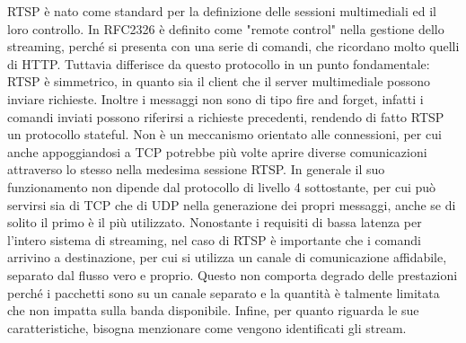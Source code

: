 RTSP è nato come standard per la definizione delle sessioni multimediali ed il loro controllo. %
In RFC2326 è definito come "remote control" nella gestione dello streaming, perché si presenta con una serie di comandi, che ricordano molto quelli di HTTP. Tuttavia differisce da questo protocollo in un punto fondamentale: RTSP è simmetrico, in quanto sia il client che il server multimediale possono inviare richieste. Inoltre i messaggi non sono di tipo fire and forget, infatti i comandi inviati possono riferirsi a richieste precedenti, rendendo di fatto RTSP un protocollo stateful\cite{a11rfc2326}. %
Non è un meccanismo orientato alle connessioni, per cui anche appoggiandosi a TCP potrebbe più volte aprire diverse comunicazioni attraverso lo stesso nella medesima sessione RTSP. In generale il suo funzionamento non dipende dal protocollo di livello 4 sottostante, per cui può servirsi sia di TCP che di UDP nella generazione dei propri messaggi, anche se di solito il primo è il più utilizzato. Nonostante i requisiti di bassa latenza per l'intero sistema di streaming, nel caso di RTSP è importante che i comandi arrivino a destinazione, per cui si utilizza un canale di comunicazione affidabile, separato dal flusso vero e proprio. Questo non comporta degrado delle prestazioni perché i pacchetti sono su un canale separato e la quantità è talmente limitata che non impatta sulla banda disponibile. Infine, per quanto riguarda le sue caratteristiche, bisogna menzionare come vengono identificati gli stream. 

